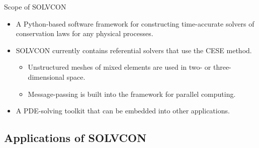 \documentclass[dvips,xcolor=pst,14pt]{beamer}
\begin{document}
\begin{frame}{
%
Scope of SOLVCON
%
}
\begin{itemize}
  \item A Python-based software framework for constructing time-accurate
  solvers of conservation laws for any physical processes.
  \item SOLVCON currently contains referential solvers that use the CESE method.
  \begin{itemize}
    \item Unstructured meshes of mixed elements are used in two- or
    three-dimensional space.
    \item Message-passing is built into the framework for parallel computing.
  \end{itemize}
  \item A PDE-solving toolkit that can be embedded into other applications.
\end{itemize}
\end{frame}

\subsection{
Applications of SOLVCON
}

\end{document}
